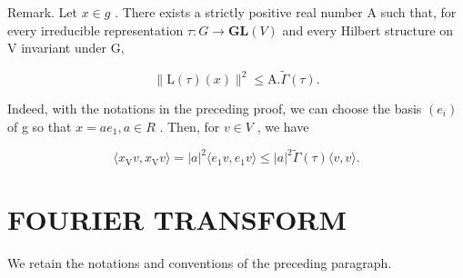 Remark. Let \(x \in g\) . There exists a strictly positive real number A such that, for every irreducible representation \(\tau : G \to \mathbf{GL}(V)\) and every Hilbert structure on V invariant under G,

\[
\| \mathrm{L} (\tau) (x) \| ^ {2} \leq \mathrm{A}. \tilde {\Gamma} (\tau).
\]

Indeed, with the notations in the preceding proof, we can choose the basis \((e_{i})\) of g so that \(x = ae_{1}, a \in R\) . Then, for \(v \in V\) , we have

\[
\langle x _ {\mathrm{V}} v, x _ {\mathrm{V}} v \rangle = | a | ^ {2} \langle e _ {1} v, e _ {1} v \rangle \leq | a | ^ {2} \tilde {\Gamma} (\tau) \langle v, v \rangle .
\]

\section{FOURIER TRANSFORM}

We retain the notations and conventions of the preceding paragraph.